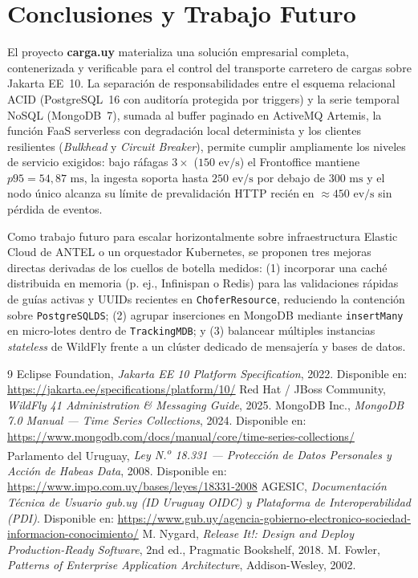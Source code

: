 \documentclass[11pt,a4paper,twocolumn]{article}
\begin{document}
\section{Conclusiones y Trabajo Futuro}\label{sec:concl}

El proyecto \textbf{carga.uy} materializa una solución empresarial completa, contenerizada y verificable para el control del transporte carretero de cargas sobre Jakarta EE~10. La separación de responsabilidades entre el esquema relacional ACID (PostgreSQL~16 con auditoría protegida por triggers) y la serie temporal NoSQL (MongoDB~7), sumada al buffer paginado en ActiveMQ Artemis, la función FaaS serverless con degradación local determinista y los clientes resilientes (\textit{Bulkhead} y \textit{Circuit Breaker}), permite cumplir ampliamente los niveles de servicio exigidos: bajo ráfagas $3\times$ ($150\text{ ev/s}$) el Frontoffice mantiene $p95 = 54{,}87\text{ ms}$, la ingesta soporta hasta $250\text{ ev/s}$ por debajo de $300\text{ ms}$ y el nodo único alcanza su límite de prevalidación HTTP recién en $\approx 450\text{ ev/s}$ sin pérdida de eventos.

Como trabajo futuro para escalar horizontalmente sobre infraestructura Elastic Cloud de ANTEL o un orquestador Kubernetes, se proponen tres mejoras directas derivadas de los cuellos de botella medidos: (1) incorporar una caché distribuida en memoria (p. ej., Infinispan o Redis) para las validaciones rápidas de guías activas y UUIDs recientes en \texttt{ChoferResource}, reduciendo la contención sobre \texttt{PostgreSQLDS}; (2) agrupar inserciones en MongoDB mediante \texttt{insertMany} en micro-lotes dentro de \texttt{TrackingMDB}; y (3) balancear múltiples instancias \textit{stateless} de WildFly frente a un clúster dedicado de mensajería y bases de datos.

\begin{thebibliography}{9}
 Eclipse Foundation, \textit{Jakarta EE 10 Platform Specification}, 2022. Disponible en: \url{https://jakarta.ee/specifications/platform/10/}
 Red Hat / JBoss Community, \textit{WildFly 41 Administration \& Messaging Guide}, 2025.
 MongoDB Inc., \textit{MongoDB 7.0 Manual --- Time Series Collections}, 2024. Disponible en: \url{https://www.mongodb.com/docs/manual/core/time-series-collections/}
 Parlamento del Uruguay, \textit{Ley N.\textsuperscript{o} 18.331 --- Protección de Datos Personales y Acción de Habeas Data}, 2008. Disponible en: \url{https://www.impo.com.uy/bases/leyes/18331-2008}
 AGESIC, \textit{Documentación Técnica de Usuario gub.uy (ID Uruguay OIDC) y Plataforma de Interoperabilidad (PDI)}. Disponible en: \url{https://www.gub.uy/agencia-gobierno-electronico-sociedad-informacion-conocimiento/}
 M. Nygard, \textit{Release It!: Design and Deploy Production-Ready Software}, 2nd ed., Pragmatic Bookshelf, 2018.
 M. Fowler, \textit{Patterns of Enterprise Application Architecture}, Addison-Wesley, 2002.
\end{thebibliography}
\end{document}
